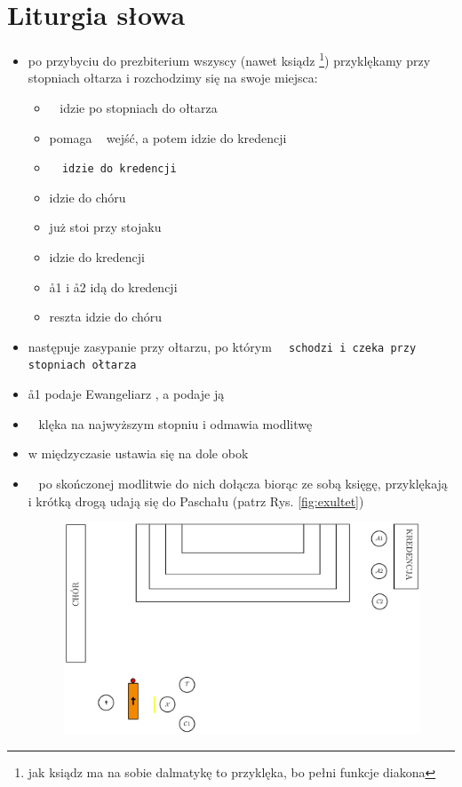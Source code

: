 \section{Liturgia słowa}

\begin{itemize}
	\item po przybyciu do prezbiterium wszyscy (nawet ksiądz \footnote{jak
		      ksiądz ma na sobie dalmatykę to przyklęka, bo pełni funkcje diakona})
	      przyklękamy przy stopniach ołtarza i rozchodzimy się na swoje miejsca:
	      \begin{itemize}
		      \item \ii~ idzie po stopniach do ołtarza
		      \item {} pomaga \ii~ wejść, a potem idzie do kredencji
		      \item \tt~ idzie do kredencji
		      \item {} idzie do chóru
		      \item {} już stoi przy stojaku
		      \item {} idzie do kredencji
		      \item \aa1 i \aa2 idą do kredencji
		      \item reszta idzie do chóru
	      \end{itemize}
	\item następuje zasypanie przy ołtarzu, po którym \tt~ schodzi i czeka
	      przy stopniach ołtarza
	\item \aa1 podaje Ewangeliarz , a  podaje ją \ii~
	\item \ii~ klęka na najwyższym stopniu i odmawia modlitwę
	\item w międzyczasie  ustawia się na dole obok \tt
	\item \ii~ po skończonej modlitwie do nich dołącza biorąc ze sobą księgę,
	      przyklękają i krótką drogą udają się do Paschału (patrz Rys.
	      \ref{fig:exultet})
	      \begin{figure}[h!]
		      \centering
		      \includegraphics[width=0.8\linewidth]{Figures/Sobota/exultet.pdf}

\end{figure}
\end{itemize}
